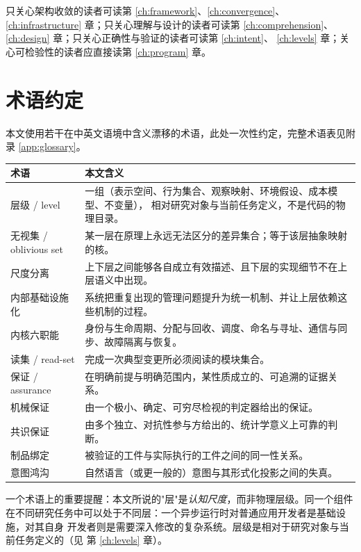 \begin{remark}[阅读指南]
只关心架构收敛的读者可读第 \ref{ch:framework}、\ref{ch:convergence}、
\ref{ch:infrastructure} 章；只关心理解与设计的读者可读第 \ref{ch:comprehension}、
\ref{ch:design} 章；只关心正确性与验证的读者可读第 \ref{ch:intent}、
\ref{ch:levels} 章；关心可检验性的读者应直接读第 \ref{ch:program} 章。
\end{remark}

\section{术语约定}

本文使用若干在中英文语境中含义漂移的术语，此处一次性约定，完整术语表见附录
\ref{app:glossary}。

\begin{longtable}{L{3.1cm}L{11.4cm}}
\toprule
\textbf{术语} & \textbf{本文含义} \\
\midrule
\endhead
层级 / level & 一组（表示空间、行为集合、观察映射、环境假设、成本模型、不变量），
  相对研究对象与当前任务定义，不是代码的物理目录。 \\
无视集 / oblivious set & 某一层在原理上永远无法区分的差异集合；等于该层抽象映射的核。 \\
尺度分离 & 上下层之间能够各自成立有效描述、且下层的实现细节不在上层语义中出现。 \\
内部基础设施化 & 系统把重复出现的管理问题提升为统一机制、并让上层依赖这些机制的过程。 \\
内核六职能 & 身份与生命周期、分配与回收、调度、命名与寻址、通信与同步、故障隔离与恢复。 \\
读集 / read-set & 完成一次典型变更所必须阅读的模块集合。 \\
保证 / assurance & 在明确前提与明确范围内，某性质成立的、可追溯的证据关系。 \\
机械保证 & 由一个极小、确定、可穷尽检视的判定器给出的保证。 \\
共识保证 & 由多个独立、对抗性参与方给出的、统计学意义上可靠的判断。 \\
制品绑定 & 被验证的工件与实际执行的工件之间的同一性关系。 \\
意图鸿沟 & 自然语言（或更一般的）意图与其形式化投影之间的失真。 \\
\bottomrule
\end{longtable}

一个术语上的重要提醒：本文所说的"层"是\emph{认知尺度}，而非物理层级。同一个组件
在不同研究任务中可以处于不同层：一个异步运行时对普通应用开发者是基础设施，对其自身
开发者则是需要深入修改的复杂系统。层级是相对于研究对象与当前任务定义的（见
第 \ref{ch:levels} 章）。
